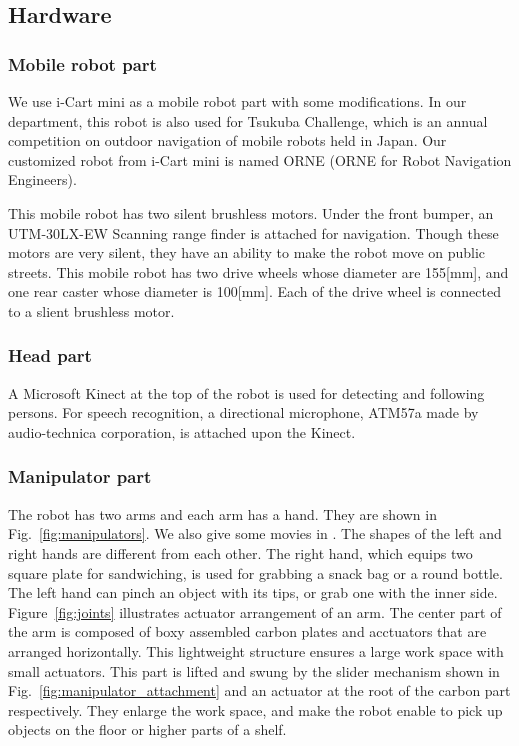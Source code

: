 \documentclass{llncs}
\begin{document}
\subsection{Hardware}
\subsubsection{Mobile robot part}

We use i-Cart mini\cite{icartmini} as a mobile robot part
with some modifications. 
In our department, this robot is also used for Tsukuba Challenge,
which is an annual competition on outdoor navigation of mobile robots
held in Japan.
Our customized robot from i-Cart mini is named ORNE
(ORNE for Robot Navigation Engineers).

This mobile robot has two silent brushless motors.
Under the front bumper, an UTM-30LX-EW Scanning range finder
is attached for navigation.
Though these motors are very silent, 
they have an ability to make the robot move on public streets.
This mobile robot has two drive wheels whose diameter are 155[mm], 
and one rear caster whose diameter is 100[mm].
Each of the drive wheel is connected to a slient brushless motor.


\subsubsection{Head part}

A Microsoft Kinect at the top of the robot is used for
detecting and following persons.
For speech recognition, a directional microphone,
ATM57a made by audio-technica corporation, is attached
upon the Kinect.


\subsubsection{Manipulator part}

The robot has two arms and each arm has a hand.
They are shown in Fig.~\ref{fig:manipulators}.
We also give some movies in \cite{citba2016}.
The shapes of the left and right hands are different from each other.
The right hand, which equips two square plate for sandwiching,
is used for grabbing a snack bag or a round bottle.
The left hand can pinch an object with its tips,
or grab one with the inner side.
Figure~\ref{fig:joints} illustrates actuator arrangement of an arm.
The center part of the arm is composed of boxy assembled carbon plates
and acctuators that are arranged horizontally.
This lightweight structure ensures a large work space with small actuators.
This part is lifted and swung by the slider mechanism shown in
Fig.~\ref{fig:manipulator_attachment} and an actuator at the
root of the carbon part respectively.
They enlarge the work space, and make the robot enable to pick up
objects on the floor or higher parts of a shelf.
\end{document}
